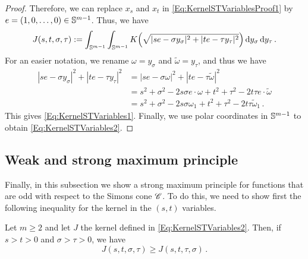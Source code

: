 \begin{proof}
Therefore, we can replace $x_s$ and $x_t$ in \eqref{Eq:KernelSTVariablesProof1} by $e =(1,0,\ldots,
0) \in \mathbb{S}^{m-1}$. Thus, we have
\begin{equation}
\label{Eq:KernelSTVariablesProof2}
J(s,t,\sigma, \tau) := \int_{\mathbb{S}^{m-1}}  \int_{\mathbb{S}^{m-1}} K\Big( \sqrt{|s e - \sigma y_\sigma|^2 + |t e - \tau y_\tau|^2 }\Big) \,\mathrm{d} y_\sigma \,\mathrm{d} y_\tau \,.
\end{equation}
For an easier notation, we rename $\omega = y_\sigma$ and $\tilde\omega = y_\tau$, and thus we have
\begin{align*}
|s e - \sigma y_\sigma|^2 + |t e - \tau y_\tau|^2 &= |s e - \sigma \omega|^2 + |t e - \tau \tilde\omega|^2\\
&= s^2 +\sigma^2 - 2 s \sigma e \cdot \omega + t^2 + \tau^2 - 2 t \tau e\cdot \tilde\omega \\
&= s^2 +\sigma^2 - 2 s \sigma \omega_1 + t^2 + \tau^2 - 2t \tau\tilde\omega_1\,.
\end{align*}
This gives \eqref{Eq:KernelSTVariables1}. Finally, we use polar coordinates in $\mathbb{S}^{m-1}$ to
obtain \eqref{Eq:KernelSTVariables2}.
\end{proof}





\subsection{Weak and strong maximum principle}



Finally, in this subsection we show a strong maximum principle for functions that are odd with
respect to the Simons cone $\mathscr{C}$. To do this, we need to show first the following inequality for
the kernel in the $(s,t)$ variables.

\begin{lemma}
\label{Lemma:KernelInequalityCone} Let $m\geq 2$ and let $J$ the kernel defined in
\eqref{Eq:KernelSTVariables2}. Then, if $s>t>0$ and $\sigma > \tau>0$, we have 
\begin{equation}
\label{Eq:KernelInequalityCone}
J(s,t,\sigma, \tau) \geq J(s,t,\tau, \sigma)\,.
\end{equation}
\end{lemma}

